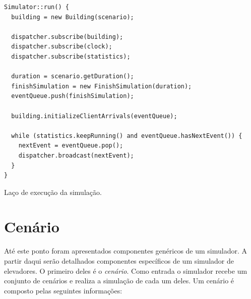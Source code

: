 \begin{algorithm}[htb!]
  \centering
    \begin{verbatim}
Simulator::run() {
  building = new Building(scenario);

  dispatcher.subscribe(building);
  dispatcher.subscribe(clock);
  dispatcher.subscribe(statistics);

  duration = scenario.getDuration();
  finishSimulation = new FinishSimulation(duration);
  eventQueue.push(finishSimulation);

  building.initializeClientArrivals(eventQueue);

  while (statistics.keepRunning() and eventQueue.hasNextEvent()) {
    nextEvent = eventQueue.pop();
    dispatcher.broadcast(nextEvent);
  }
}
    \end{verbatim}
  \caption{\label{alg:sim}Laço de execução da simulação.}
\end{algorithm}

\section{\label{model:scenario}Cenário}

Até este ponto foram apresentados componentes genéricos de um simulador. A
partir daqui serão detalhados componentes específicos de um simulador de
elevadores. O primeiro deles é o \textit{cenário}. Como entrada o simulador
recebe um conjunto de cenários e realiza a simulação de cada um deles. Um
cenário é composto pelas seguintes informações:

